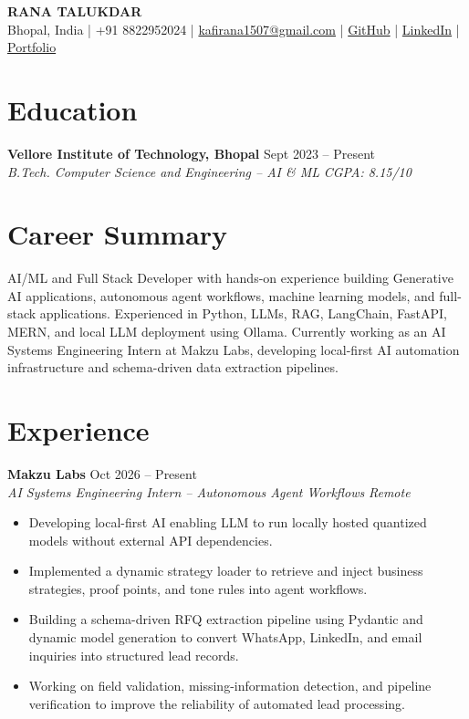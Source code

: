 \documentclass[10pt,a4paper]{article}
\newcommand{\resumeItem}[1]{
  \item\small{#1}
}
\newcommand{\resumeSubheading}[4]{
  \textbf{#1} \hfill \small #2\\
  \textit{\small #3} \hfill \textit{\small #4}
}
\begin{document}
\begin{center}
    {\LARGE \textbf{RANA TALUKDAR}}\\[4pt]
    \small
    Bhopal, India \;|\;
    +91 8822952024 \;|\;
    \href{mailto:kafirana1507@gmail.com}{kafirana1507@gmail.com} \;|\;
    \href{https://github.com/Auth0r-C0dez}{GitHub} \;|\;
    \href{https://www.linkedin.com/in/rana-talukdar-782b60293/}{LinkedIn} \;|\;
    \href{https://devwithrana.vercel.app/}{Portfolio}
\end{center}
\section{Education}

\resumeSubheading
{Vellore Institute of Technology, Bhopal}{Sept 2023 -- Present}
{B.Tech. Computer Science and Engineering -- AI \& ML}
{CGPA: 8.15/10}


\section{Career Summary}

AI/ML and Full Stack Developer with hands-on experience building Generative AI applications, autonomous agent workflows, machine learning models, and full-stack applications. Experienced in Python, LLMs, RAG, LangChain, FastAPI, MERN, and local LLM deployment using Ollama. Currently working as an AI Systems Engineering Intern at Makzu Labs, developing local-first AI automation infrastructure and schema-driven data extraction pipelines.


\section{Experience}

\resumeSubheading
{Makzu Labs}{Oct 2026 -- Present}
{AI Systems Engineering Intern -- Autonomous Agent Workflows}
{Remote}
\begin{itemize}
    \resumeItem{Developing local-first AI enabling LLM to run locally hosted quantized models without external API dependencies.}
    \resumeItem{Implemented a dynamic strategy loader to retrieve and inject business strategies, proof points, and tone rules into agent workflows.}
    \resumeItem{Building a schema-driven RFQ extraction pipeline using Pydantic and dynamic model generation to convert WhatsApp, LinkedIn, and email inquiries into structured lead records.}
    \resumeItem{Working on field validation, missing-information detection, and pipeline verification to improve the reliability of automated lead processing.}
\end{itemize}
\end{document}
